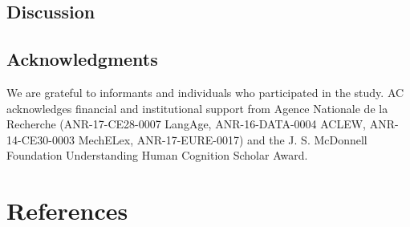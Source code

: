 \documentclass[english,,man,floatsintext]{apa6}
\begin{document}
\hypertarget{discussion}{%
\subsection{Discussion}\label{discussion}}

\newpage

\hypertarget{acknowledgments}{%
\subsection{Acknowledgments}\label{acknowledgments}}

We are grateful to informants and individuals who participated in the study. AC acknowledges financial and institutional support from Agence Nationale de la Recherche (ANR-17-CE28-0007 LangAge, ANR-16-DATA-0004 ACLEW, ANR-14-CE30-0003 MechELex, ANR-17-EURE-0017) and the J. S. McDonnell Foundation Understanding Human Cognition Scholar Award.

\hypertarget{references}{%
\section{References}\label{references}}

\setlength{\parindent}{-0.5in}
\setlength{\leftskip}{0.5in}
\end{document}
